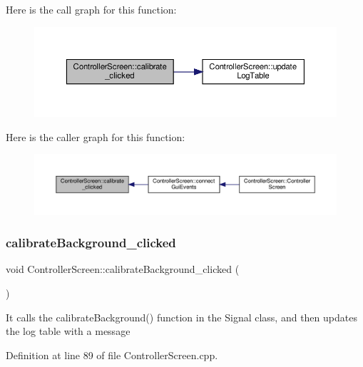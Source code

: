 Here is the call graph for this function\+:
\nopagebreak
\begin{figure}[H]
\begin{center}
\leavevmode
\includegraphics[width=350pt]{class_controller_screen_af7f51cf63bb9d2526b0025f35f1e7731_cgraph}
\end{center}
\end{figure}
Here is the caller graph for this function\+:
\nopagebreak
\begin{figure}[H]
\begin{center}
\leavevmode
\includegraphics[width=350pt]{class_controller_screen_af7f51cf63bb9d2526b0025f35f1e7731_icgraph}
\end{center}
\end{figure}
\mbox{\label{class_controller_screen_a7a71b9bc26a3de704f8613f3f2a08fb7}} 
\subsubsection{\texorpdfstring{calibrate\+Background\+\_\+clicked}{calibrateBackground\_clicked}}
{\footnotesize\ttfamily void Controller\+Screen\+::calibrate\+Background\+\_\+clicked (\begin{DoxyParamCaption}{ }\end{DoxyParamCaption})\hspace{0.3cm}{\ttfamily [slot]}}

It calls the calibrate\+Background() function in the Signal class, and then updates the log table with a message 

Definition at line 89 of file Controller\+Screen.\+cpp.

